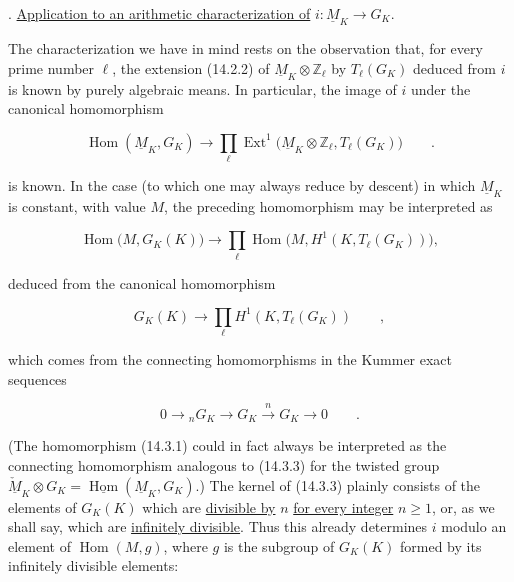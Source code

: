 \par\medskip
{}. \underline{Application to an arithmetic characterization of}
$i:\underline M_K\longrightarrow G_K$.

The characterization we have in mind rests on the observation that,
for every prime number $\ell$, the extension (14.2.2) of
$\underline M_K\otimes\mathbb Z_\ell$ by $T_\ell(G_K)$ deduced from
$i$ is known by purely algebraic means.  In particular, the image of
$i$ under the canonical homomorphism

\begin{equation}\tag{14.3.1}
 \operatorname{Hom}(\underline M_K,G_K)\longrightarrow
 \prod_\ell\operatorname{Ext}^1
 \bigl(\underline M_K\otimes\mathbb Z_\ell,T_\ell(G_K)\bigr)
 \qquad .
\end{equation}

\noindent
is known.  In the case (to which one may always reduce by descent) in
which $\underline M_K$ is constant, with value $M$, the preceding
homomorphism may be interpreted as

\begin{equation}\tag{14.3.2}
 \operatorname{Hom}\bigl(M,G_K(K)\bigr)\longrightarrow
 \prod_\ell\operatorname{Hom}
 \bigl(M,H^1(K,T_\ell(G_K))\bigr),
\end{equation}

\noindent
deduced from the canonical homomorphism

\begin{equation}\tag{14.3.3}
 G_K(K)\longrightarrow\prod_\ell H^1(K,T_\ell(G_K))
 \qquad ,
\end{equation}

\noindent
which comes from the connecting homomorphisms in the Kummer exact
sequences

\begin{equation*}
 0\longrightarrow{}_nG_K\longrightarrow G_K
 \xrightarrow{\ n\ }G_K\longrightarrow0\qquad .
\end{equation*}

(The homomorphism (14.3.1) could in fact always be interpreted as the
connecting homomorphism analogous to (14.3.3) for the twisted group
$\check{\underline M}_K\otimes G_K=
\underline{\operatorname{Hom}}(\underline M_K,G_K)$.)  The kernel of
(14.3.3) plainly consists of the elements of $G_K(K)$ which are
\underline{divisible by} $n$ \underline{for every integer}
$n\geq1$, or, as we shall say, which are \underline{infinitely
divisible}.  Thus this already determines $i$ modulo an element of
$\operatorname{Hom}(M,g)$, where $g$ is the subgroup of $G_K(K)$
formed by its infinitely divisible elements:

